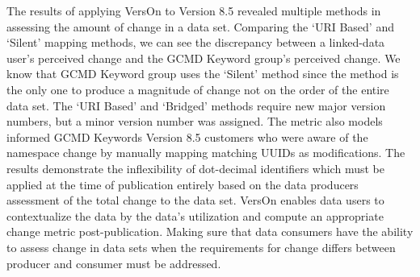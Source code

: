 The results of applying VersOn to Version 8.5 revealed multiple methods in assessing the amount of change in a data set.
Comparing the `URI Based' and `Silent' mapping methods, we can see the discrepancy between a linked-data user's perceived change and the GCMD Keyword group's perceived change.
We know that GCMD Keyword group uses the `Silent' method since the method is the only one to produce a magnitude of change not on the order of the entire data set.
The `URI Based' and `Bridged' methods require new major version numbers, but a minor version number was assigned.
The metric also models informed GCMD Keywords Version 8.5 customers who were aware of the namespace change by manually mapping matching UUIDs as modifications.
The results demonstrate the inflexibility of dot-decimal identifiers which must be applied at the time of publication entirely based on the data producers assessment of the total change to the data set.
VersOn enables data users to contextualize the data by the data's utilization and compute an appropriate change metric post-publication.
Making sure that data consumers have the ability to assess change in data sets when the requirements for change differs between producer and consumer must be addressed.